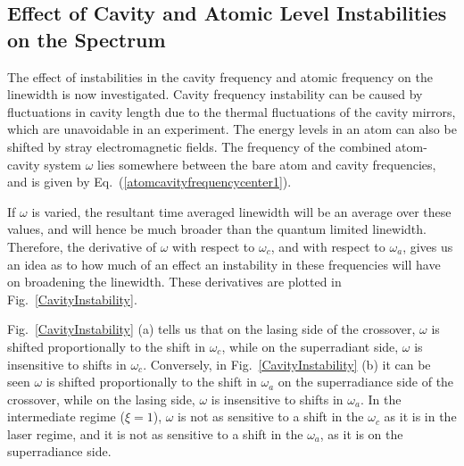 \documentclass[aps,
twocolumn,
superscriptaddress,groupedaddress]{revtex4}
\begin{document}
\subsection{Effect of Cavity and Atomic Level Instabilities on the
Spectrum}

The effect of instabilities in the cavity frequency and atomic frequency
on the linewidth is now investigated. Cavity frequency instability can
be caused by fluctuations in cavity length due to the thermal
fluctuations of the cavity mirrors, which are unavoidable in an
experiment. The energy levels in an atom can also be shifted by stray
electromagnetic fields. The frequency of the combined atom-cavity system
$\omega$ lies somewhere between the bare atom and cavity frequencies,
and is given by Eq.~(\ref{atomcavityfrequencycenter1}).

If $\omega$ is varied, the resultant time averaged linewidth will be an
average over these values, and will hence be much broader than the
quantum limited linewidth. Therefore, the derivative of  $\omega$ with
respect to $\omega_c$, and with respect to $\omega_a$, gives us an idea
as to how much of an effect an instability in these frequencies will
have on broadening the linewidth. These derivatives are plotted in
Fig.~\ref{CavityInstability}.

Fig.~\ref{CavityInstability} (a) tells us that on the lasing side of the
crossover, $\omega$ is shifted proportionally to the shift in
$\omega_c$, while on the superradiant side, $\omega$ is insensitive to
shifts in $\omega_c$.  Conversely, in Fig.~\ref{CavityInstability} (b)
it can be seen $\omega$ is shifted proportionally to the shift in
$\omega_a$ on the superradiance side of the crossover, while on the
lasing side, $\omega$ is insensitive to shifts in $\omega_a$. In the
intermediate regime ($\xi=1$), $\omega$ is not as sensitive to a shift
in the $\omega_c$ as it is in the laser regime, and it is not as
sensitive to a shift in the $\omega_a$, as it is on the superradiance
side.
\end{document}
